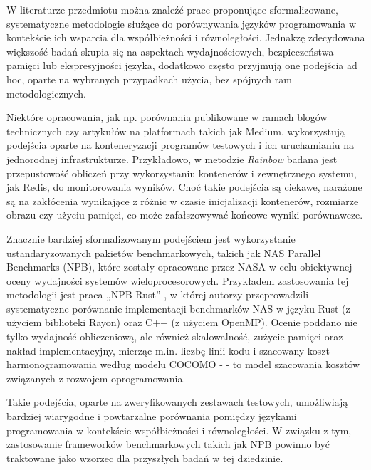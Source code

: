 W literaturze przedmiotu można znaleźć prace proponujące sformalizowane, systematyczne metodologie służące do porównywania języków programowania w kontekście ich wsparcia dla współbieżności i równoległości. Jednakzę zdecydowana większość badań skupia się na aspektach wydajnościowych, bezpieczeństwa pamięci lub ekspresyjności języka, dodatkowo często przyjmują one podejścia ad hoc, oparte na wybranych przypadkach użycia, bez spójnych ram metodologicznych.

Niektóre opracowania, jak np. porównania publikowane w ramach blogów technicznych czy artykułów na platformach takich jak Medium, wykorzystują podejścia oparte na konteneryzacji programów testowych i ich uruchamianiu na jednorodnej infrastrukturze. Przykładowo, w metodzie \textit{Rainbow} \cite{rainbow} badana jest przepustowość obliczeń przy wykorzystaniu kontenerów i zewnętrznego systemu, jak Redis, do monitorowania wyników. Choć takie podejścia są ciekawe, narażone są na zakłócenia wynikające z różnic w czasie inicjalizacji kontenerów, rozmiarze obrazu czy użyciu pamięci, co może zafałszowywać końcowe wyniki porównawcze.

Znacznie bardziej sformalizowanym podejściem jest wykorzystanie ustandaryzowanych pakietów benchmarkowych, takich jak NAS Parallel Benchmarks (NPB), które zostały opracowane przez NASA w celu obiektywnej oceny wydajności systemów wieloprocesorowych. Przykładem zastosowania tej metodologii jest praca „NPB-Rust” \cite{martins2025npbrustnasparallelbenchmarks}, w której autorzy przeprowadzili systematyczne porównanie implementacji benchmarków NAS w języku Rust (z użyciem biblioteki Rayon) oraz C++ (z użyciem OpenMP). Ocenie poddano nie tylko wydajność obliczeniową, ale również skalowalność, zużycie pamięci oraz nakład implementacyjny, mierząc m.in. liczbę linii kodu i szacowany koszt harmonogramowania według modelu COCOMO -  - to model szacowania kosztów związanych z rozwojem oprogramowania.

Takie podejścia, oparte na zweryfikowanych zestawach testowych, umożliwiają bardziej wiarygodne i powtarzalne porównania pomiędzy językami programowania w kontekście współbieżności i równoległości. W związku z tym, zastosowanie frameworków benchmarkowych takich jak NPB powinno być traktowane jako wzorzec dla przyszłych badań w tej dziedzinie.

